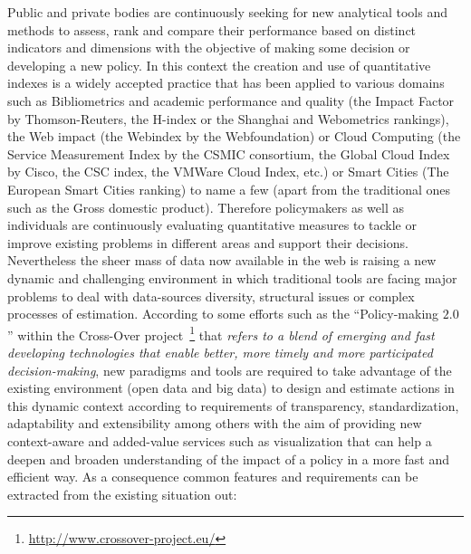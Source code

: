 Public and private bodies are continuously seeking for new analytical tools and methods to assess, rank and compare their performance based 
on distinct indicators and dimensions with the objective of making some decision or developing a new policy. 
In this context the creation and use of quantitative indexes is a widely accepted practice that has been applied to various 
domains such as Bibliometrics and academic performance and quality (the Impact Factor by Thomson-Reuters, the H-index or the Shanghai and Webometrics rankings), 
the Web impact (the Webindex by the Webfoundation) or Cloud Computing (the Service Measurement Index by the CSMIC consortium, the Global Cloud Index by Cisco, 
the CSC index, the VMWare Cloud Index, etc.) or Smart Cities (The European Smart Cities ranking) to name a few (apart from the traditional ones such as the Gross domestic product). 
Therefore policymakers as well as individuals are continuously evaluating quantitative measures to tackle or improve 
existing problems in different areas and support their decisions. Nevertheless the sheer mass of data now available in the web is 
raising a new dynamic and challenging environment in which traditional tools are facing major 
problems to deal with data-sources diversity, structural issues or complex processes of estimation. According to some efforts 
such as the ``Policy-making $2.0$'' within the Cross-Over project~\footnote{\url{http://www.crossover-project.eu/}} that \textit{refers to a blend of emerging and fast developing technologies 
that enable better, more timely and more participated decision-making}, new paradigms and tools are required to take advantage of 
the existing environment (open data and big data) to design and estimate actions in this dynamic context according to requirements of 
transparency, standardization, adaptability and extensibility among others with the aim of providing new context-aware 
and added-value services such as visualization that can help a deepen and broaden understanding of the impact of a 
policy in a more fast and efficient way. As a consequence common features and requirements can be extracted from the existing situation out:
